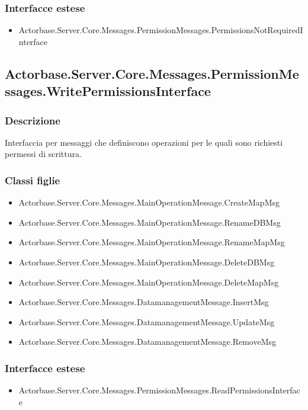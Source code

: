 \documentclass[a4paper]{article}
\begin{document}
			\subsubsection{Interfacce estese}
			\begin{itemize}
				\item Actorbase.Server.Core.Messages.PermissionMessages.PermissionsNotRequiredInterface
			\end{itemize}

			\subsection{Actorbase.Server.Core.Messages.PermissionMessages.WritePermissionsInterface}
			\subsubsection{Descrizione}
				Interfaccia per messaggi che definiscono operazioni per le quali sono richiesti permessi di scrittura.
			\subsubsection{Classi figlie}
			\begin{itemize}
				\item Actorbase.Server.Core.Messages.MainOperationMessage.CreateMapMsg
				\item Actorbase.Server.Core.Messages.MainOperationMessage.RenameDBMsg
				\item Actorbase.Server.Core.Messages.MainOperationMessage.RenameMapMsg
				\item Actorbase.Server.Core.Messages.MainOperationMessage.DeleteDBMsg
				\item Actorbase.Server.Core.Messages.MainOperationMessage.DeleteMapMsg
				\item Actorbase.Server.Core.Messages.DatamanagementMessage.InsertMsg
				\item Actorbase.Server.Core.Messages.DatamanagementMessage.UpdateMsg
				\item Actorbase.Server.Core.Messages.DatamanagementMessage.RemoveMsg
			\end{itemize}
			\subsubsection{Interfacce estese}
			\begin{itemize}
				\item Actorbase.Server.Core.Messages.PermissionMessages.ReadPermissionsInterface
			\end{itemize}
			
\end{document}
